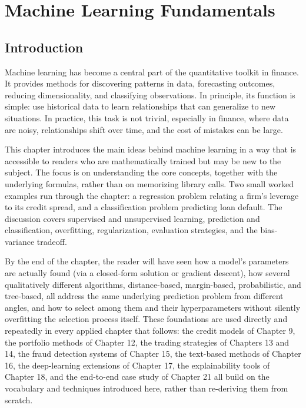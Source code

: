 \documentclass[../ai_in_finance]{subfiles}
\begin{document}
\chapter{Machine Learning Fundamentals}

\section{Introduction}

Machine learning has become a central part of the quantitative toolkit in finance. It provides methods for discovering patterns in data, forecasting outcomes, reducing dimensionality, and classifying observations. In principle, its function is simple: use historical data to learn relationships that can generalize to new situations. In practice, this task is not trivial, especially in finance, where data are noisy, relationships shift over time, and the cost of mistakes can be large.

This chapter introduces the main ideas behind machine learning in a way that is accessible to readers who are mathematically trained but may be new to the subject. The focus is on understanding the core concepts, together with the underlying formulas, rather than on memorizing library calls. Two small worked examples run through the chapter: a regression problem relating a firm's leverage to its credit spread, and a classification problem predicting loan default. The discussion covers supervised and unsupervised learning, prediction and classification, overfitting, regularization, evaluation strategies, and the bias-variance tradeoff.

By the end of the chapter, the reader will have seen how a model's parameters are actually found (via a closed-form solution or gradient descent), how several qualitatively different algorithms, distance-based, margin-based, probabilistic, and tree-based, all address the same underlying prediction problem from different angles, and how to select among them and their hyperparameters without silently overfitting the selection process itself. These foundations are used directly and repeatedly in every applied chapter that follows: the credit models of Chapter 9, the portfolio methods of Chapter 12, the trading strategies of Chapters 13 and 14, the fraud detection systems of Chapter 15, the text-based methods of Chapter 16, the deep-learning extensions of Chapter 17, the explainability tools of Chapter 18, and the end-to-end case study of Chapter 21 all build on the vocabulary and techniques introduced here, rather than re-deriving them from scratch.
\end{document}
